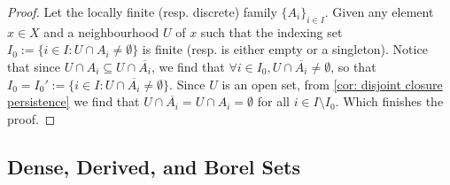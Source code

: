 \begin{proof}
Let the locally finite (resp. discrete) family \(\{A_i\}_{i \in I}\). Given
any element \(x \in X\) and a neighbourhood \(U\) of \(x\) such that the
indexing set \(I_0 := \{i \in I: U \cap A_i \neq \emptyset\}\) is finite
(resp. is either empty or a singleton). Notice that since \(U \cap A_i
\subseteq U \cap \overline{A_i}\), we find that \(\forall i \in I_0, U \cap
\overline{A_i} \neq \emptyset\), so that \(I_0 = I_0' := \{i \in I: U \cap
\overline{A_i} \neq \emptyset\}\). Since \(U\) is an open set, from \cref{cor:
disjoint closure persistence} we find that \(U \cap \overline{A_i} = U \cap
A_i = \emptyset\) for all \(i \in I \setminus I_0\). Which finishes the proof.
\end{proof}

\subsection{Dense, Derived, and Borel Sets}

